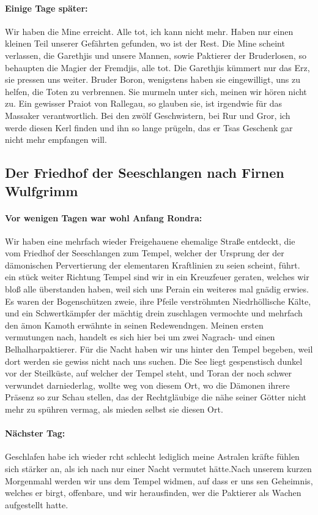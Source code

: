 \paragraph{Einige Tage später:}
Wir haben die Mine erreicht. Alle tot, ich kann nicht mehr. Haben nur einen kleinen Teil unserer Gefährten gefunden, wo ist der Rest. Die Mine scheint verlassen, die Garethjis und unsere Mannen, sowie Paktierer der Bruderlosen, so behaupten die Magier der Fremdjis, alle tot. Die Garethjis kümmert nur das Erz, sie pressen uns weiter. Bruder Boron, wenigstens haben sie eingewilligt, uns zu helfen, die Toten zu verbrennen.
Sie murmeln unter sich, meinen wir hören nicht zu. Ein gewisser Praiot von Rallegau, so glauben sie, ist irgendwie für das Massaker verantwortlich. Bei den zwölf Geschwistern, bei Rur und Gror, ich werde diesen Kerl finden und ihn so lange prügeln, das er Tsas Geschenk gar nicht mehr empfangen will.


\subsection{Der Friedhof der Seeschlangen nach Firnen Wulfgrimm}
\paragraph{Vor wenigen Tagen war wohl Anfang Rondra:}
Wir haben eine mehrfach wieder Freigehauene ehemalige Straße entdeckt, die vom Friedhof der Seeschlangen zum Tempel, welcher der Ursprung der der dämonischen Pervertierung der elementaren Kraftlinien zu seien scheint, führt. ein stück weiter Richtung Tempel sind wir in ein Kreuzfeuer geraten, welches wir bloß alle überstanden haben, weil sich uns Perain ein weiteres mal gnädig erwies. Es waren der Bogenschützen zweie, ihre Pfeile verströhmten Niedrhöllische Kälte, und ein Schwertkämpfer der mächtig drein zuschlagen vermochte und mehrfach den ämon Kamoth erwähnte in seinen Redewendngen. Meinen ersten vermutungen nach, handelt es sich hier bei um zwei Nagrach- und einen Belhalharpaktierer. Für die Nacht haben wir uns hinter den Tempel begeben, weil dort werden sie gewiss nicht nach uns suchen.
Die See liegt gespenstisch dunkel vor der Steilküste, auf welcher der Tempel steht, und Toran der noch schwer verwundet darniederlag, wollte weg von diesem Ort, wo die Dämonen ihrere Präsenz so zur Schau stellen, das der Rechtgläubige die nähe seiner Götter nicht mehr zu spühren vermag, als mieden selbst sie diesen Ort.

\paragraph{Nächster Tag:}
Geschlafen habe ich wieder rcht schlecht lediglich meine Astralen kräfte fühlen sich stärker an, als ich nach nur einer Nacht vermutet hätte.Nach unserem kurzen Morgenmahl werden wir uns dem Tempel widmen, auf dass er uns sen Geheimnis, welches er birgt, offenbare, und wir herausfinden, wer die Paktierer als Wachen aufgestellt hatte.


